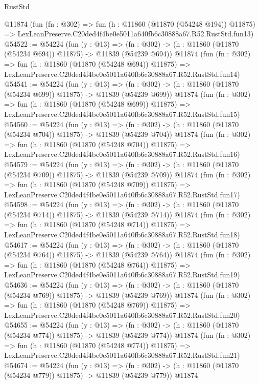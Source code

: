 \begin{lexlean}{RustStd}
\begin{coremodule}
    @11874
    (fun (fn : @302) =>
    fun (h : @11860 (@11870 (@54248 @194)) @11875) =>
    LexLeanPreserve.C20ded4f4be0e5011a640fb6c30888a67.R52.RustStd.fun13)
@54522 := @54224
    (fun (y : @13) =>
    (fn : @302) -> (h : @11860 (@11870 (@54234 @694)) @11875) -> @11839 (@54239 @694))
    @11874
    (fun (fn : @302) =>
    fun (h : @11860 (@11870 (@54248 @694)) @11875) =>
    LexLeanPreserve.C20ded4f4be0e5011a640fb6c30888a67.R52.RustStd.fun14)
@54541 := @54224
    (fun (y : @13) =>
    (fn : @302) -> (h : @11860 (@11870 (@54234 @699)) @11875) -> @11839 (@54239 @699))
    @11874
    (fun (fn : @302) =>
    fun (h : @11860 (@11870 (@54248 @699)) @11875) =>
    LexLeanPreserve.C20ded4f4be0e5011a640fb6c30888a67.R52.RustStd.fun15)
@54560 := @54224
    (fun (y : @13) =>
    (fn : @302) -> (h : @11860 (@11870 (@54234 @704)) @11875) -> @11839 (@54239 @704))
    @11874
    (fun (fn : @302) =>
    fun (h : @11860 (@11870 (@54248 @704)) @11875) =>
    LexLeanPreserve.C20ded4f4be0e5011a640fb6c30888a67.R52.RustStd.fun16)
@54579 := @54224
    (fun (y : @13) =>
    (fn : @302) -> (h : @11860 (@11870 (@54234 @709)) @11875) -> @11839 (@54239 @709))
    @11874
    (fun (fn : @302) =>
    fun (h : @11860 (@11870 (@54248 @709)) @11875) =>
    LexLeanPreserve.C20ded4f4be0e5011a640fb6c30888a67.R52.RustStd.fun17)
@54598 := @54224
    (fun (y : @13) =>
    (fn : @302) -> (h : @11860 (@11870 (@54234 @714)) @11875) -> @11839 (@54239 @714))
    @11874
    (fun (fn : @302) =>
    fun (h : @11860 (@11870 (@54248 @714)) @11875) =>
    LexLeanPreserve.C20ded4f4be0e5011a640fb6c30888a67.R52.RustStd.fun18)
@54617 := @54224
    (fun (y : @13) =>
    (fn : @302) -> (h : @11860 (@11870 (@54234 @764)) @11875) -> @11839 (@54239 @764))
    @11874
    (fun (fn : @302) =>
    fun (h : @11860 (@11870 (@54248 @764)) @11875) =>
    LexLeanPreserve.C20ded4f4be0e5011a640fb6c30888a67.R52.RustStd.fun19)
@54636 := @54224
    (fun (y : @13) =>
    (fn : @302) -> (h : @11860 (@11870 (@54234 @769)) @11875) -> @11839 (@54239 @769))
    @11874
    (fun (fn : @302) =>
    fun (h : @11860 (@11870 (@54248 @769)) @11875) =>
    LexLeanPreserve.C20ded4f4be0e5011a640fb6c30888a67.R52.RustStd.fun20)
@54655 := @54224
    (fun (y : @13) =>
    (fn : @302) -> (h : @11860 (@11870 (@54234 @774)) @11875) -> @11839 (@54239 @774))
    @11874
    (fun (fn : @302) =>
    fun (h : @11860 (@11870 (@54248 @774)) @11875) =>
    LexLeanPreserve.C20ded4f4be0e5011a640fb6c30888a67.R52.RustStd.fun21)
@54674 := @54224
    (fun (y : @13) =>
    (fn : @302) -> (h : @11860 (@11870 (@54234 @779)) @11875) -> @11839 (@54239 @779))
    @11874

\end{coremodule}
\end{lexlean}
